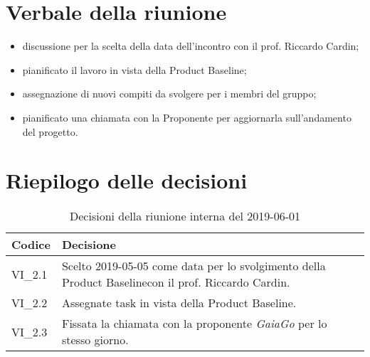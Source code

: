 \section{Verbale della riunione}
\begin{itemize}
	\item discussione per la scelta della data dell'incontro con il prof. Riccardo Cardin;
	\item pianificato il lavoro in vista della Product Baseline\glo;
	\item assegnazione di nuovi compiti da svolgere per i membri del gruppo;
	\item pianificato una chiamata con la Proponente per aggiornarla sull'andamento del progetto.

\end{itemize} 

\section{Riepilogo delle decisioni}

	
	\begin{longtable}{ >{\centering}p{} >{}p{}}
		\caption{Decisioni della riunione interna del 2019-06-01}\\	
		\rowcolorhead
		\textbf{\color{white}Codice} 
		& \centering\textbf{\color{white}Decisione} 
		\tabularnewline 
		\endfirsthead
		VI\_2.1 & Scelto 2019-05-05 come data per lo svolgimento della Product Baseline\glosp con il prof. Riccardo Cardin.
		
		\tabularnewline 
		VI\_2.2 & Assegnate task in vista della Product Baseline.
		
		\tabularnewline 
		VI\_2.3 & Fissata la chiamata con la proponente \textit{GaiaGo} per lo stesso giorno.
		
	\end{longtable}
	




